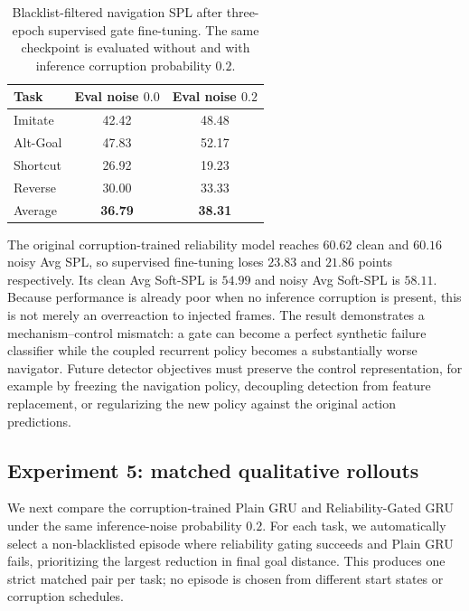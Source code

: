 \documentclass[conference]{IEEEtran}
\begin{document}
\begin{table}[t]
\centering
\caption{Blacklist-filtered navigation SPL after three-epoch supervised gate
fine-tuning. The same checkpoint is evaluated without and with inference
corruption probability $0.2$.}
\label{tab:supervised_gate_nav}
\small
\setlength{\tabcolsep}{5pt}
\begin{tabular}{lcc}
\toprule
Task & Eval noise $0.0$ & Eval noise $0.2$ \\
\midrule
Imitate  & 42.42 & 48.48 \\
Alt-Goal & 47.83 & 52.17 \\
Shortcut & 26.92 & 19.23 \\
Reverse  & 30.00 & 33.33 \\
\midrule
Average  & \textbf{36.79} & \textbf{38.31} \\
\bottomrule
\end{tabular}
\end{table}

The original corruption-trained reliability model reaches $60.62$ clean and
$60.16$ noisy Avg SPL, so supervised fine-tuning loses $23.83$ and $21.86$
points respectively. Its clean Avg Soft-SPL is $54.99$ and noisy Avg Soft-SPL
is $58.11$. Because performance is already poor when no inference corruption
is present, this is not merely an overreaction to injected frames. The result
demonstrates a mechanism--control mismatch: a gate can become a perfect
synthetic failure classifier while the coupled recurrent policy becomes a
substantially worse navigator. Future detector objectives must preserve the
control representation, for example by freezing the navigation policy,
decoupling detection from feature replacement, or regularizing the new policy
against the original action predictions.

\subsection{Experiment 5: matched qualitative rollouts}
\label{sec:qualitative}

We next compare the corruption-trained Plain GRU and Reliability-Gated GRU
under the same inference-noise probability $0.2$. For each task, we
automatically select a non-blacklisted episode where reliability gating
succeeds and Plain GRU fails, prioritizing the largest reduction in final
goal distance. This produces one strict matched pair per task; no episode is
chosen from different start states or corruption schedules.
\end{document}
